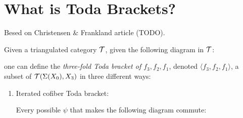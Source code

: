 \section{What is Toda Brackets?}

Besed on Christensen \& Frankland article (TODO).

\begin{definition}
    Given a triangulated category \( {\mathcal{T}} \), given the following diagram in \( {\mathcal{T}} \):

    \begin{center}
    \end{center}

    one can define the \emph{three-fold Toda bracket of \( f_3, f_2, f_1 \)}, denoted \( \langle f_3, f_2, f_1 \rangle \), a subset of \( {\mathcal{T}}(\Sigma(X_0), X_3) \) in three different ways: \sloppy

    \begin{enumerate}
        \item {
            Iterated cofiber Toda bracket:

            Every possible \( \psi \) that makes the following diagram commute:

            \begin{center}
            \end{center}

}
\end{enumerate}
\end{definition}
